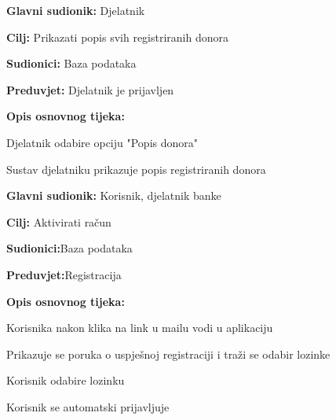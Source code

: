 \eject 
\noindent {}
					\begin{packed_item}
	
						\item \textbf{Glavni sudionik: }Djelatnik
						\item \textbf{Cilj:} Prikazati popis svih registriranih donora
						\item \textbf{Sudionici:} Baza podataka
						\item \textbf{Preduvjet:} Djelatnik je prijavljen
						\item \textbf{Opis osnovnog tijeka:}
						
						\item[] \begin{packed_enum}
	
							\item Djelatnik odabire opciju "Popis donora"
							\item Sustav djelatniku prikazuje popis registriranih donora
						\end{packed_enum}

					\end{packed_item}


\noindent {}
\begin{packed_item}
	
	\item \textbf{Glavni sudionik: } {Korisnik, djelatnik banke}
	\item  \textbf{Cilj:} {Aktivirati račun}
	\item  \textbf{Sudionici:}{Baza podataka} 
	\item  \textbf{Preduvjet:}{Registracija}
	\item  \textbf{Opis osnovnog tijeka:}
	
	\item[] \begin{packed_enum}
		
		\item {Korisnika nakon klika na link u mailu vodi u aplikaciju}
		\item {Prikazuje se poruka o uspješnoj registraciji i traži se odabir lozinke} 
		\item {Korisnik odabire lozinku}
		\item {Korisnik se automatski prijavljuje}
		
	\end{packed_enum}
	
\end{packed_item}

